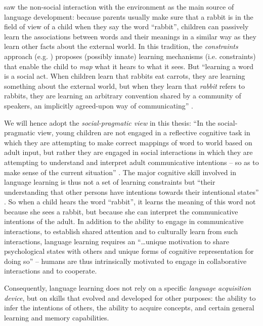 \cite{piaget52origins} saw the non-social interaction with the
environment as the main source of language development: because
parents usually make sure that a rabbit is in the field of view of a
child when they say the word ``rabbit'', children can passively learn
the associations between words and their meanings in a similar way as
they learn other facts about the external world. In this tradition,
the \emph{constraints} approach (e.g.
\citealp{markman92constraints,gleitman90structural}) proposes
(possibly innate) learning mechanisms (i.e. constraints) that enable
the child to \emph{map} what it hears to what it sees. But ``learning
a word is a social act. When children learn that rabbits eat carrots,
they are learning something about the external world, but when they
learn that \emph{rabbit} refers to rabbits, they are learning an
arbitrary convention shared by a community of speakers, an implicitly
agreed-upon way of communicating'' \citep[p. 55]{bloom00how-children}.

We will hence adopt the \emph{social-pragmatic view} in this thesis:
``In the social-pragmatic view, young children are not engaged in a
reflective cognitive task in which they are attempting to make correct
mappings of word to world based on adult input, but rather they are
engaged in social interactions in which they are attempting to
understand and interpret adult communicative intentions -- so as to
make sense of the current situation''
\citep[p. 135]{tomasello01perceiving}. The major cognitive skill
involved in language learning is thus not a set of learning
constraints but ``their understanding that other persons have
intentions towards their intentional states''
\citep[p. 135]{tomasello01perceiving}. So when a child hears the word
``rabbit'', it learns the meaning of this word not because she sees a
rabbit, but because she can interpret the communicative intentions of
the adult. In addition to the ability to engage in communicative
interactions, to establish shared attention and to culturally learn
from such interactions, language learning requires an ``\dots unique
motivation to share psychological states with others and unique forms
of cognitive representation for doing so''
\citep*[p. 675]{tomasello05understanding} -- humans are thus
intrinsically motivated to engage in collaborative interactions and to
cooperate.

Consequently, language learning does not rely on a specific
\emph{language acquisition device}, but on skills that evolved and
developed for other purposes: the ability to infer the intentions of
others, the ability to acquire concepts, and certain general learning
and memory capabilities.



